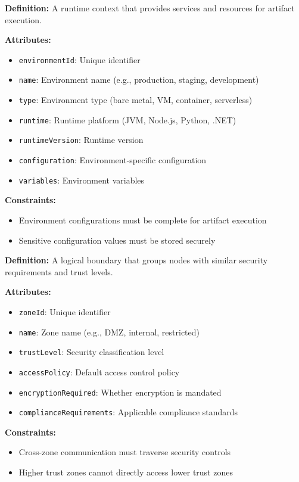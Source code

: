 \documentclass[11pt,letterpaper]{article}
\begin{document}
\begin{definitionbox}
\textbf{Definition:} A runtime context that provides services and resources for artifact execution.

\textbf{Attributes:}
\begin{itemize}[nosep]
    \item \texttt{environmentId}: Unique identifier
    \item \texttt{name}: Environment name (e.g., production, staging, development)
    \item \texttt{type}: Environment type (bare metal, VM, container, serverless)
    \item \texttt{runtime}: Runtime platform (JVM, Node.js, Python, .NET)
    \item \texttt{runtimeVersion}: Runtime version
    \item \texttt{configuration}: Environment-specific configuration
    \item \texttt{variables}: Environment variables
\end{itemize}

\textbf{Constraints:}
\begin{itemize}[nosep]
    \item Environment configurations must be complete for artifact execution
    \item Sensitive configuration values must be stored securely
\end{itemize}
\end{definitionbox}

\begin{definitionbox}
\textbf{Definition:} A logical boundary that groups nodes with similar security requirements and trust levels.

\textbf{Attributes:}
\begin{itemize}[nosep]
    \item \texttt{zoneId}: Unique identifier
    \item \texttt{name}: Zone name (e.g., DMZ, internal, restricted)
    \item \texttt{trustLevel}: Security classification level
    \item \texttt{accessPolicy}: Default access control policy
    \item \texttt{encryptionRequired}: Whether encryption is mandated
    \item \texttt{complianceRequirements}: Applicable compliance standards
\end{itemize}

\textbf{Constraints:}
\begin{itemize}[nosep]
    \item Cross-zone communication must traverse security controls
    \item Higher trust zones cannot directly access lower trust zones
\end{itemize}
\end{definitionbox}
\end{document}
